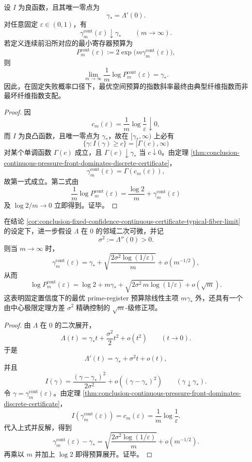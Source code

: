 \begin{corollary}[固定置信度下连续证书指数向典型纤维指数收敛]\label{cor:conclusion-fixed-confidence-continuous-certificate-typical-fiber-limit}
设 \(I\) 为良函数，且其唯一零点为
\[
\gamma_{\ast}=\Lambda'(0).
\]
对任意固定 \(\varepsilon\in(0,1)\)，有
\[
\gamma_m^{\mathrm{cont}}(\varepsilon)\downarrow \gamma_{\ast}
\qquad (m\to\infty).
\]
若定义连续前沿所对应的最小寄存器预算为
\[
P_m^{\mathrm{cont}}(\varepsilon):=
2\exp\bigl(m\gamma_m^{\mathrm{cont}}(\varepsilon)\bigr),
\]
则
\[
\lim_{m\to\infty}\frac1m\log P_m^{\mathrm{cont}}(\varepsilon)=\gamma_{\ast}.
\]
因此，在固定失败概率口径下，最优空间预算的指数斜率最终由典型纤维指数而非最坏纤维指数支配。
\end{corollary}
\begin{proof}
因
\[
c_m(\varepsilon)=\frac1m\log\frac1\varepsilon\downarrow 0,
\]
而 \(I\) 为良凸函数，且唯一零点为 \(\gamma_{\ast}\)，故在 \([\gamma_{\ast},\infty)\) 上必有
\[
\{\gamma:I(\gamma)\ge c\}=[\Gamma(c),\infty)
\]
对某个单调函数 \(\Gamma(c)\) 成立，且 \(\Gamma(c)\downarrow \gamma_{\ast}\) 当 \(c\downarrow 0\)。由定理 \ref{thm:conclusion-continuous-pressure-front-dominates-discrete-certificate}，
\[
\gamma_m^{\mathrm{cont}}(\varepsilon)=\Gamma(c_m(\varepsilon)),
\]
故第一式成立。第二式由
\[
\frac1m\log P_m^{\mathrm{cont}}(\varepsilon)
=
\frac{\log 2}{m}+\gamma_m^{\mathrm{cont}}(\varepsilon)
\]
及 \(\log 2/m\to 0\) 立即得到。证毕。
\end{proof}

\begin{theorem}[固定置信度下连续证书预算的平方根修正律]\label{thm:conclusion-fixed-confidence-continuous-certificate-sqrtm-correction}
在结论 \ref{cor:conclusion-fixed-confidence-continuous-certificate-typical-fiber-limit} 的设定下，进一步假设 \(\Lambda\) 在 \(0\) 的邻域二次可微，并记
\[
\sigma^2:=\Lambda''(0)>0.
\]
则当 \(m\to\infty\) 时，
\[
\gamma_m^{\mathrm{cont}}(\varepsilon)
=
\gamma_{\ast}
+
\sqrt{\frac{2\sigma^2\log(1/\varepsilon)}{m}}
+
o(m^{-1/2}),
\]
从而
\[
\log P_m^{\mathrm{cont}}(\varepsilon)
=
\log 2 + m\gamma_{\ast}
+
\sqrt{2\sigma^2\,m\log(1/\varepsilon)}
+
o(\sqrt m).
\]
这表明固定置信度下的最优 prime-register 预算除线性主项 \(m\gamma_{\ast}\) 外，还具有一个由中心极限定理方差 \(\sigma^2\) 精确控制的 \(\sqrt m\)-级修正项。
\end{theorem}
\begin{proof}
由 \(\Lambda\) 在 \(0\) 的二次展开，
\[
\Lambda(t)=\gamma_{\ast}t+\frac{\sigma^2}{2}t^2+o(t^2)
\qquad (t\to 0).
\]
于是
\[
\Lambda'(t)=\gamma_{\ast}+\sigma^2 t+o(t),
\]
并且
\[
I(\gamma)=\frac{(\gamma-\gamma_{\ast})^2}{2\sigma^2}
+o\!\left((\gamma-\gamma_{\ast})^2\right)
\qquad (\gamma\downarrow\gamma_{\ast}).
\]
令 \(\gamma=\gamma_m^{\mathrm{cont}}(\varepsilon)\)。由定理 \ref{thm:conclusion-continuous-pressure-front-dominates-discrete-certificate}，
\[
I(\gamma_m^{\mathrm{cont}}(\varepsilon))=c_m(\varepsilon)=\frac1m\log\frac1\varepsilon.
\]
代入上式并反解，得到
\[
\gamma_m^{\mathrm{cont}}(\varepsilon)-\gamma_{\ast}
=
\sqrt{\frac{2\sigma^2\log(1/\varepsilon)}{m}}
+
o(m^{-1/2}).
\]
再乘以 \(m\) 并加上 \(\log 2\) 即得预算展开。证毕。
\end{proof}

